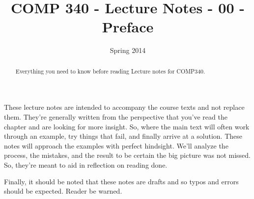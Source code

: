 \documentclass[]{tufte-handout}
\title{COMP 340 - Lecture Notes - 00 - Preface}
\date{Spring 2014}
\begin{document}
\maketitle

\begin{abstract}
Everything you need to know before reading Lecture notes for COMP340.
\end{abstract}

These lecture notes are intended to accompany the course texts
and not replace them.  They're generally written from the perspective that you've read the chapter and are looking for more insight.  So, where the main text will often work through an example, try things that fail, and finally arrive at a solution.  These notes will approach the examples with perfect hindsight.  We'll analyze the process, the mistakes, and the result to be certain the big picture was not missed.  So, they're meant to aid in reflection on reading done. 

Finally, it should be noted that these notes are drafts and so typos and errors should be expected. Reader be warned.
\end{document}
